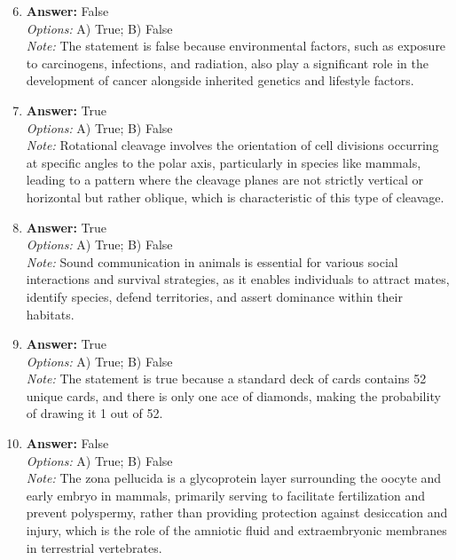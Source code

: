 \documentclass[12pt]{article}
\begin{document}
\begin{enumerate}[label=\arabic*.]
\setcounter{enumi}{5}
\item \textbf{Answer:} False
\\ \textit{Options:} A) True; B) False
\\ \textit{Note:} The statement is false because environmental factors, such as exposure to carcinogens, infections, and radiation, also play a significant role in the development of cancer alongside inherited genetics and lifestyle factors.
\item \textbf{Answer:} True
\\ \textit{Options:} A) True; B) False
\\ \textit{Note:} Rotational cleavage involves the orientation of cell divisions occurring at specific angles to the polar axis, particularly in species like mammals, leading to a pattern where the cleavage planes are not strictly vertical or horizontal but rather oblique, which is characteristic of this type of cleavage.
\item \textbf{Answer:} True
\\ \textit{Options:} A) True; B) False
\\ \textit{Note:} Sound communication in animals is essential for various social interactions and survival strategies, as it enables individuals to attract mates, identify species, defend territories, and assert dominance within their habitats.
\item \textbf{Answer:} True
\\ \textit{Options:} A) True; B) False
\\ \textit{Note:} The statement is true because a standard deck of cards contains 52 unique cards, and there is only one ace of diamonds, making the probability of drawing it 1 out of 52.
\item \textbf{Answer:} False
\\ \textit{Options:} A) True; B) False
\\ \textit{Note:} The zona pellucida is a glycoprotein layer surrounding the oocyte and early embryo in mammals, primarily serving to facilitate fertilization and prevent polyspermy, rather than providing protection against desiccation and injury, which is the role of the amniotic fluid and extraembryonic membranes in terrestrial vertebrates.
\end{enumerate}
\end{document}
